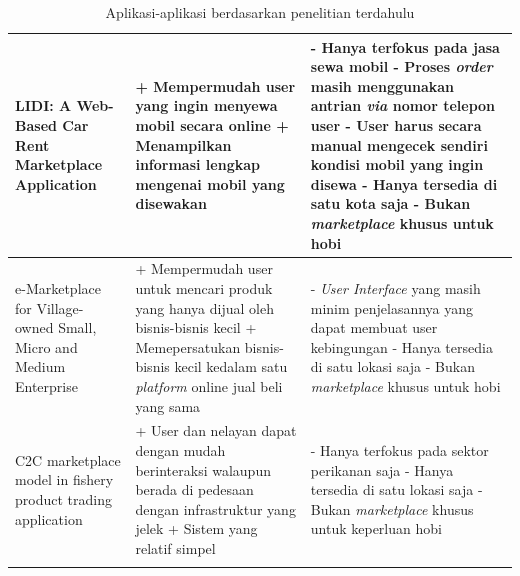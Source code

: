 \documentclass[a4paper]{article}
\begin{document}
\begin{longtable}{|p{3cm}|p{5cm}|p{5cm}|}
    \hline
    LIDI: A Web-Based Car Rent Marketplace Application
             & + Mempermudah user yang ingin menyewa mobil secara online \newline
    + Menampilkan informasi lengkap mengenai mobil yang disewakan \newline
             & - Hanya terfokus pada jasa sewa mobil \newline
    - Proses \textit{order} masih menggunakan antrian \textit{via} nomor telepon user \newline
    - User harus secara manual mengecek sendiri kondisi mobil yang ingin disewa \newline
    - Hanya tersedia di satu kota saja \newline
    - Bukan \textit{marketplace} khusus untuk hobi                                                                                               \\
    \hline
    e-Marketplace for Village-owned Small, Micro and Medium Enterprise
             & + Mempermudah user untuk mencari produk yang hanya dijual oleh bisnis-bisnis kecil \newline
    + Memepersatukan bisnis-bisnis kecil kedalam satu \textit{platform} online jual beli yang sama \newline
             & - \textit{User Interface} yang masih minim penjelasannya yang dapat membuat user kebingungan \newline
    - Hanya tersedia di satu lokasi saja \newline
    - Bukan \textit{marketplace} khusus untuk hobi                                                                                               \\
    \hline
    C2C marketplace model in fishery product trading application
             & + User dan nelayan dapat dengan mudah berinteraksi walaupun berada di pedesaan dengan infrastruktur yang jelek \newline
    + Sistem yang relatif simpel \newline
             & - Hanya terfokus pada sektor perikanan saja \newline
    - Hanya tersedia di satu lokasi saja \newline
    - Bukan \textit{marketplace} khusus untuk keperluan hobi                                                                                     \\
    \hline
    \caption{Aplikasi-aplikasi berdasarkan penelitian terdahulu}
\end{longtable}
\end{document}
